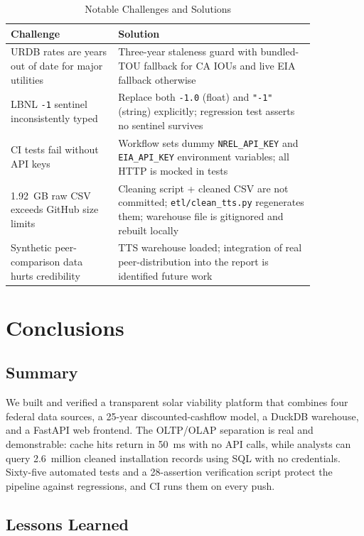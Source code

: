 \documentclass[10pt, conference]{IEEEtran}
\begin{document}
\begin{table}[H]
\centering
\caption{Notable Challenges and Solutions}
\label{tab:challenges}
\small
\begin{tabular}{p{0.30\linewidth}p{0.55\linewidth}}
\toprule
\textbf{Challenge} & \textbf{Solution} \\
\midrule
URDB rates are years out of date for major utilities & Three-year staleness guard with bundled-TOU fallback for CA IOUs and live EIA fallback otherwise \\
\midrule
LBNL \texttt{-1} sentinel inconsistently typed & Replace both \texttt{-1.0} (float) and \texttt{"-1"} (string) explicitly; regression test asserts no sentinel survives \\
\midrule
CI tests fail without API keys & Workflow sets dummy \texttt{NREL\_API\_KEY} and \texttt{EIA\_API\_KEY} environment variables; all HTTP is mocked in tests \\
\midrule
1.92~GB raw CSV exceeds GitHub size limits & Cleaning script + cleaned CSV are not committed; \texttt{etl/clean\_tts.py} regenerates them; warehouse file is gitignored and rebuilt locally \\
\midrule
Synthetic peer-comparison data hurts credibility & TTS warehouse loaded; integration of real peer-distribution into the report is identified future work \\
\bottomrule
\end{tabular}
\end{table}

\section{Conclusions}

\subsection{Summary}

We built and verified a transparent solar viability platform that combines four federal data sources, a 25-year discounted-cashflow model, a DuckDB warehouse, and a FastAPI web frontend. The OLTP/OLAP separation is real and demonstrable: cache hits return in 50~ms with no API calls, while analysts can query 2.6~million cleaned installation records using SQL with no credentials. Sixty-five automated tests and a 28-assertion verification script protect the pipeline against regressions, and CI runs them on every push.

\subsection{Lessons Learned}
\end{document}
